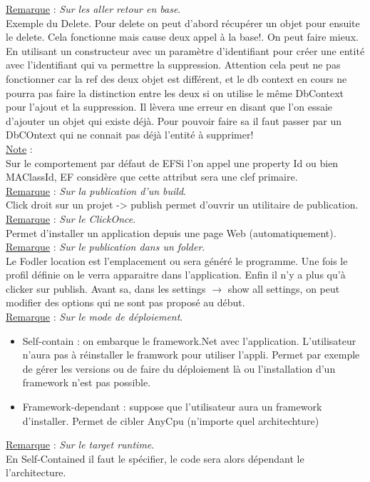 \documentclass[a4paper,12pt,twoside]{article}
\newcommand{\rem}[2]{\noindent\underline{Remarque} : \textit{#1}.\\ \indent #2}
\newcommand{\note}[1]{\noindent\underline{Note} : \\ \indent #1}
\begin{document}
\rem{Sur les aller retour en base}{Exemple du Delete. Pour delete on peut d'abord récupérer un objet pour ensuite le delete. Cela fonctionne mais cause deux appel à la base!. On peut faire mieux. En utilisant un constructeur avec un paramètre d'identifiant pour créer une entité avec l'identifiant qui va permettre la suppression. Attention cela peut ne pas fonctionner car la ref des deux objet est différent, et le db context en cours ne pourra pas faire la distinction entre les deux si on utilise le même DbContext pour l'ajout et la suppression. Il lèvera une erreur en disant que l'on essaie d'ajouter un objet qui existe déjà. Pour pouvoir faire sa il faut passer par un DbCOntext qui ne connait pas déjà l'entité à supprimer!}\\

\note{Sur le comportement par défaut de EF}{Si l'on appel une property Id ou bien MAClassId, EF considère que cette attribut sera une clef primaire.}\\

\rem{Sur la publication d'un build}{Click droit sur un projet -> publish permet d'ouvrir un utilitaire de publication.}\\

\rem{Sur le ClickOnce}{Permet d'installer un application depuis une page Web (automatiquement).}\\

\rem{Sur le publication dans un folder}{Le Fodler location est l'emplacement ou sera généré le programme. Une fois le profil définie on le verra apparaitre dans l'application. Enfin il n'y a plus qu'à clicker sur publish. Avant sa, dans les settings $\to$ show all settings, on peut modifier des options qui ne sont pas proposé au début.}\\

\rem{Sur le mode de déploiement}{\begin{itemize}
\item Self-contain : on embarque le framework.Net avec l'application. L'utilisateur n'aura pas à réinstaller le framwork pour utiliser l'appli. Permet par exemple de gérer les versions ou de faire du déploiement là ou l'installation d'un framework n'est pas possible.
\item Framework-dependant : suppose que l'utilisateur aura un framework d'installer. Permet de cibler AnyCpu (n'importe quel architechture) \\
\end{itemize}}

\rem{Sur le target runtime}{En Self-Contained il faut le spécifier, le code sera alors dépendant le l'architecture.}\\
\end{document}
